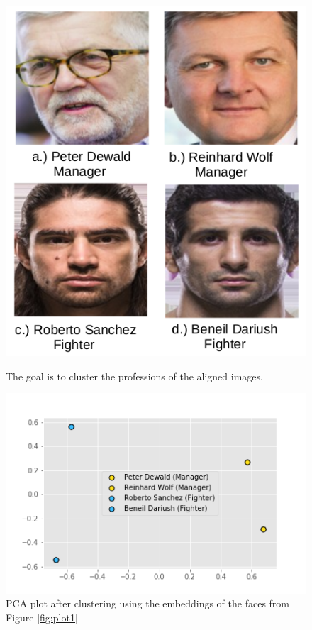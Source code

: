 \documentclass[12pt,english]{article}
\begin{document}
\begin{figure}[h!]
  \centering
  \begin{minipage}[b]{0.3\textwidth}
    \includegraphics[width=\textwidth]{figures/plot2.png}
    \caption{The goal is to cluster the professions of the aligned images.}
    \label{fig:plot1}
  \end{minipage}
  \hfill
  \begin{minipage}[b]{0.6\textwidth}
    \includegraphics[width=\textwidth]{figures/plot.png}
    \caption{PCA plot after clustering using the embeddings of the faces from Figure \ref{fig:plot1}}
    \label{fig:plot2}
  \end{minipage}
\end{figure}
\end{document}
